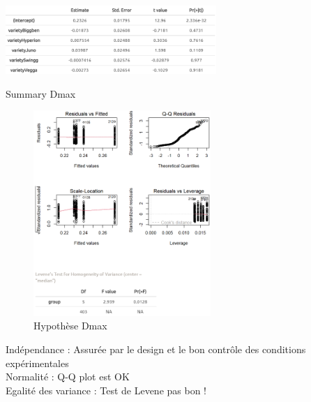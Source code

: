 \newpage

\label{an:Dmax}
\begin{table}[ht]
\centering
\includegraphics[width=0.6\textwidth]{Image/summary Dmax.png}
\caption{Summary Dmax}
\end{table}
\begin{figure}[ht]
\centering
\includegraphics[width=0.6\textwidth]{Image/hypothese Dmax.png}
\caption{Hypothèse Dmax}
\end{figure}
\noindent Indépendance : Assurée par le design et le bon contrôle des conditions expérimentales \\
Normalité : Q-Q plot est OK \\
Egalité des variance : Test de Levene pas bon !

\newpage

